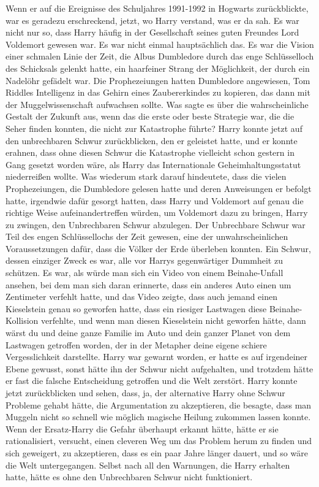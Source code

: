 Wenn er auf die Ereignisse des Schuljahres 1991-1992 in Hogwarts zurückblickte,
war es geradezu erschreckend, jetzt, wo Harry verstand, was er da sah. Es war
nicht nur so, dass Harry häufig in der Gesellschaft seines guten Freundes Lord
Voldemort gewesen war. Es war nicht einmal hauptsächlich das. Es war die Vision
einer schmalen Linie der Zeit, die Albus Dumbledore durch das enge Schlüsselloch
des Schicksals gelenkt hatte, ein haarfeiner Strang der Möglichkeit, der durch
ein Nadelöhr gefädelt war. Die Prophezeiungen hatten Dumbledore angewiesen, Tom
Riddles Intelligenz in das Gehirn eines Zaubererkindes zu kopieren, das dann mit
der Muggelwissenschaft aufwachsen sollte. Was sagte es über die wahrscheinliche
Gestalt der Zukunft aus, wenn das die erste oder beste Strategie war, die die
Seher finden konnten, die nicht zur Katastrophe führte? Harry konnte jetzt auf
den unbrechbaren Schwur zurückblicken, den er geleistet hatte, und er konnte
erahnen, dass ohne diesen Schwur die Katastrophe vielleicht schon gestern in
Gang gesetzt worden wäre, als Harry das Internationale Geheimhaltungsstatut
niederreißen wollte. Was wiederum stark darauf hindeutete, dass die vielen
Prophezeiungen, die Dumbledore gelesen hatte und deren Anweisungen er befolgt
hatte, irgendwie dafür gesorgt hatten, dass Harry und Voldemort auf genau die
richtige Weise aufeinandertreffen würden, um Voldemort dazu zu bringen, Harry zu
zwingen, den Unbrechbaren Schwur abzulegen. Der Unbrechbare Schwur war Teil des
engen Schlüssellochs der Zeit gewesen, eine der unwahrscheinlichen
Voraussetzungen dafür, dass die Völker der Erde überleben konnten. Ein Schwur,
dessen einziger Zweck es war, alle vor Harrys gegenwärtiger Dummheit zu
schützen. Es war, als würde man sich ein Video von einem Beinahe-Unfall ansehen,
bei dem man sich daran erinnerte, dass ein anderes Auto einen um Zentimeter
verfehlt hatte, und das Video zeigte, dass auch jemand einen Kieselstein genau
so geworfen hatte, dass ein riesiger Lastwagen diese Beinahe-Kollision
verfehlte, und wenn man diesen Kieselstein nicht geworfen hätte, dann wärst du
und deine ganze Familie im Auto und dein ganzer Planet von dem Lastwagen
getroffen worden, der in der Metapher deine eigene schiere Vergesslichkeit
darstellte. Harry war gewarnt worden, er hatte es auf irgendeiner Ebene gewusst,
sonst hätte ihn der Schwur nicht aufgehalten, und trotzdem hätte er fast die
falsche Entscheidung getroffen und die Welt zerstört. Harry konnte jetzt
zurückblicken und sehen, dass, ja, der alternative Harry ohne Schwur Probleme
gehabt hätte, die Argumentation zu akzeptieren, die besagte, dass man Muggeln
nicht so schnell wie möglich magische Heilung zukommen lassen konnte. Wenn der
Ersatz-Harry die Gefahr überhaupt erkannt hätte, hätte er sie rationalisiert,
versucht, einen cleveren Weg um das Problem herum zu finden und sich geweigert,
zu akzeptieren, dass es ein paar Jahre länger dauert, und so wäre die Welt
untergegangen. Selbst nach all den Warnungen, die Harry erhalten hatte, hätte es
ohne den Unbrechbaren Schwur nicht funktioniert.

